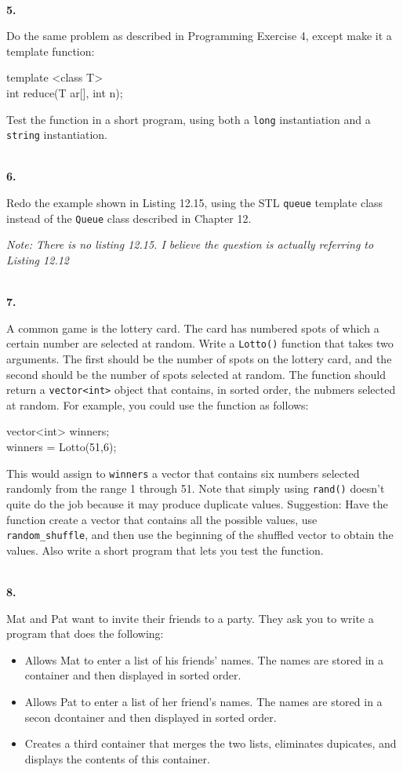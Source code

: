\documentclass[10 pt]{amsart}
\newlength{\cwidth}
\newenvironment{cpart}[2][\cwidth]
	{%
		\\ %
		\textbf{#2. }%
		\begin{minipage}[t]{#1}%
		\setlength{\parindent}{0pt}%
		\setlength{\parskip}{2ex}%
	}
	{%
		\end{minipage}%
	}
\newcommand{\ttt}[1]{\texttt{#1}}
\begin{document}
	\begin{cpart}{5}
		Do the same problem as described in Programming Exercise 4,
		except make it a template function: 
		
		{\ttfamily
			template <class T> \\
			int reduce(T ar[], int n);
		}

		Test the function in a short program, using both a \ttt{long}
		instantiation and a \ttt{string} instantiation.
	\end{cpart}

	\begin{cpart}{6}
		Redo the example shown in Listing 12.15, using the STL \ttt{queue}
		template class instead of the \ttt{Queue} class described
		in Chapter 12.

		\emph{Note: There is no listing 12.15. I believe the
		question is actually referring to Listing 12.12}
	\end{cpart}

	\begin{cpart}{7}
		A common game is the lottery card.
		The card has numbered spots of which a certain number are
		selected at random.
		Write a \ttt{Lotto()} function that takes two arguments.
		The first should be the number of spots on the lottery card,
		and the second should be the number of spots selected at 
		random.
		The function should return a \ttt{vector<int>} object
		that contains, in sorted order, the nubmers selected
		at random.
		For example, you could use the function as follows:

		{\ttfamily
			vector<int> winners; \\
			winners = Lotto(51,6);
		}

		This would assign to \ttt{winners} a vector that contains
		six numbers selected randomly from
		the range 1 through 51.
		Note that simply using \ttt{rand()} doesn't quite do the job
		because it may produce duplicate values.
		Suggestion: Have the function create a vector that contains
		all the possible values, use \ttt{random\_shuffle}, and then
		use the beginning of the shuffled vector to obtain the values.
		Also write a short program that lets you test the function.
	\end{cpart}

	\begin{cpart}{8}
		Mat and Pat want to invite their friends to a party.
		They ask you to write a program that does the following:
		\begin{itemize}
			\item 
				Allows Mat to enter a list of his friends' names.
				The names are stored in a container and then displayed in
				sorted order.
			\item
				Allows Pat to enter a list of her friend's names.
				The names are stored in a secon dcontainer and then
				displayed in sorted order.
			\item
				Creates a third container that merges the two 
				lists, eliminates dupicates, and displays the
				contents of this container.
		\end{itemize}
	\end{cpart}
\end{document}
